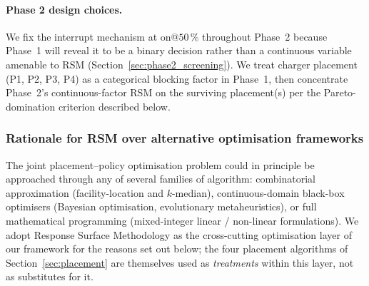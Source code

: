 \documentclass[conference]{IEEEtran}
\begin{document}
\paragraph{Phase 2 design choices.}
We fix the interrupt mechanism at on@$50\,\%$ throughout Phase~2 because Phase~1 will reveal it to be a binary decision rather than a continuous variable amenable to RSM (Section~\ref{sec:phase2_screening}). We treat charger placement (P1, P2, P3, P4) as a categorical blocking factor in Phase~1, then concentrate Phase~2's continuous-factor RSM on the surviving placement(s) per the Pareto-domination criterion described below.

\subsubsection{Rationale for RSM over alternative optimisation frameworks}
\label{sec:rsm_rationale}

The joint placement--policy optimisation problem could in principle be approached through any of several families of algorithm: combinatorial approximation (facility-location and $k$-median), continuous-domain black-box optimisers (Bayesian optimisation, evolutionary metaheuristics), or full mathematical programming (mixed-integer linear / non-linear formulations). We adopt Response Surface Methodology as the cross-cutting optimisation layer of our framework for the reasons set out below; the four placement algorithms of Section~\ref{sec:placement} are themselves used as \emph{treatments} within this layer, not as substitutes for it.
\end{document}
